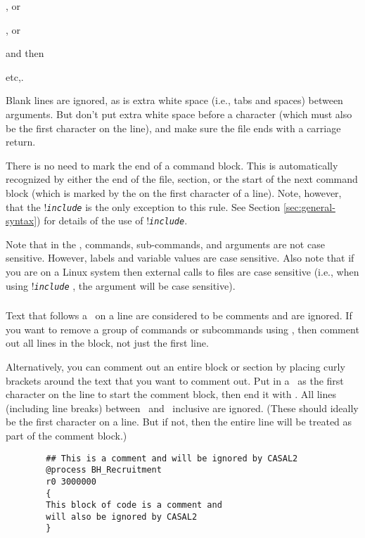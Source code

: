 \begin{description}
\item {}, or 
\item {} , or
\item {} 
\end{description}

and then
\begin{description}
\item {} 
\item {} 
\item etc,.
\end{description}

Blank lines are ignored, as is extra white space (i.e., tabs and spaces) between arguments. But don't put extra white space before a \command{} character (which must also be the first character on the line), and make sure the file ends with a carriage return.

There is no need to mark the end of a command block. This is automatically recognized by either the end of the file, section, or the start of the next command block (which is marked by the \command{} on the first character of a line). Note, however, that the !\texttt{\emph{include}} is the only exception to this rule. See Section \ref{sec:general-syntax}) for details of the use of !\texttt{\emph{include}}. 

Note that in the \config, commands, sub-commands, and arguments are not case sensitive. However, labels and variable values are case sensitive. Also note that if you are on a Linux system then external calls to files are case sensitive (i.e., when using !\texttt{\emph{include}} , the argument  will be case sensitive). 


\subsubsection{}
Text that follows a \commentline\ on a line are considered to be comments and are ignored. If you want to remove a group of commands or subcommands using \commentline, then comment out all lines in the block, not just the first line. 

Alternatively, you can comment out an entire block or section by placing curly brackets around the text that you want to comment out. Put in a \commentstart\ as the first character on the line to start the comment block, then end it with \commentend. All lines (including line breaks) between \commentstart\ and \commentend\ inclusive are ignored. (These should ideally be the first character on a line. But if not, then the entire line will be treated as part of the comment block.)
{\small{\begin{verbatim}
		## This is a comment and will be ignored by CASAL2
		@process BH_Recruitment
		r0 3000000
		{ 
		This block of code is a comment and
		will also be ignored by CASAL2
		}
		\end{verbatim}}}

